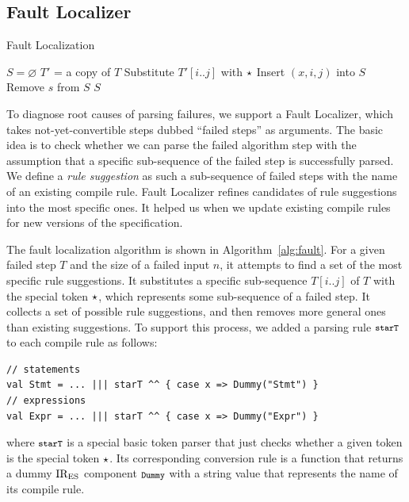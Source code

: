 \subsection{Fault Localizer}\label{sec:localizer}
\begin{algorithm}[t]
  \caption{Fault Localization}\label{alg:fault}
  \begin{algorithmic}[1]
    \State $S = \varnothing$
    \State $T'$ = a copy of $T$
    \State Substitute $T'[i..j]$ with $\star$
    \State Insert $(x, i, j)$ into $S$
    \EndIf
    \EndFor
    \EndFor
    \State Remove $s$ from $S$
    \EndIf
    \EndWhile
    \State \Return $S$
    \EndFunction
  \end{algorithmic}
\end{algorithm}

To diagnose root causes of parsing failures, we support a \textsf{Fault Localizer},
which takes not-yet-convertible steps dubbed ``failed steps'' as arguments.
The basic idea is to check whether we can parse the failed algorithm step
with the assumption that a specific sub-sequence of the
failed step is successfully parsed.  We define a \textit{rule suggestion}
as such a sub-sequence of failed steps with the name of an existing compile rule.
\textsf{Fault Localizer} refines candidates of rule suggestions into the
most specific ones. It helped us when we update existing
compile rules for new versions of the specification.

The fault localization algorithm is shown in Algorithm~\ref{alg:fault}.
For a given failed step $T$ and the size of a failed input $n$, it
attempts to find a set of the most specific rule suggestions.  It
substitutes a specific sub-sequence \( T[i..j] \) of \( T \) with the
special token \( \star \), which represents some sub-sequence of a
failed step.  It collects a set of possible rule suggestions, and then
removes more general ones than existing suggestions.  To support this
process, we added a parsing rule  \( \texttt{\footnotesize starT} \) to each compile
rule as follows:
\begin{lstlisting}[style=myScalastyle]
// statements
val Stmt = ... ||| starT ^^ { case x => Dummy("Stmt") }
// expressions
val Expr = ... ||| starT ^^ { case x => Dummy("Expr") }
\end{lstlisting}
where \( \texttt{\footnotesize starT} \) is a special basic token parser that just
checks whether a given token is the special token \( \star \). 
Its corresponding conversion rule is a function that returns a dummy
\( \text{IR}_\text{ES} \) component \( \texttt{\footnotesize Dummy} \) with a string value that
represents the name of its compile rule.


